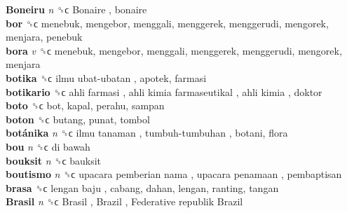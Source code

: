 \textbf{Boneiru} \emph{n}  ␝ϲ   Bonaire , bonaire  \\
\textbf{bor} ␝ϲ  menebuk, mengebor, menggali, menggerek, menggerudi, mengorek, menjara, penebuk  \\
\textbf{bora} \emph{v}  ␝ϲ  menebuk, mengebor, menggali, menggerek, menggerudi, mengorek, menjara  \\
\textbf{botika} ␝ϲ   ilmu ubat-ubatan , apotek, farmasi  \\
\textbf{botikario} ␝ϲ   ahli farmasi ,  ahli kimia farmaseutikal ,  ahli kimia , doktor  \\
\textbf{boto} ␝ϲ  bot, kapal, perahu, sampan  \\
\textbf{boton} ␝ϲ  butang, punat, tombol  \\
\textbf{botánika} \emph{n}  ␝ϲ   ilmu tanaman ,  tumbuh-tumbuhan , botani, flora  \\
\textbf{bou} \emph{n}  ␝ϲ   di bawah   \\
\textbf{bouksit} \emph{n}  ␝ϲ  bauksit  \\
\textbf{boutismo} \emph{n}  ␝ϲ   upacara pemberian nama ,  upacara penamaan , pembaptisan  \\
\textbf{brasa} ␝ϲ   lengan baju , cabang, dahan, lengan, ranting, tangan  \\
\textbf{Brasil} \emph{n}  ␝ϲ   Brasil ,  Brazil ,  Federative republik Brazil   \\
